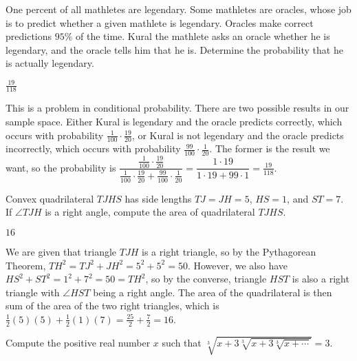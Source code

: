 \documentclass[11pt]{article}
\begin{document}
\begin{problem}%
One percent of all mathletes are legendary. Some mathletes are oracles, whose job is to predict
whether a given mathlete is legendary. Oracles make correct predictions $95\%$ of the time.
Kural the mathlete asks an oracle whether he is legendary, and the oracle tells him that he is.
Determine the probability that he is actually legendary.
\end{problem}

\begin{answer}
$\boxed{\frac{19}{118}}$
\end{answer}

\begin{solution}
This is a problem in conditional probability. There are two possible results in our sample space.
Either Kural is legendary and the oracle predicts correctly, which occurs with probability
$\frac{1}{100} \cdot \frac{19}{20}$, or Kural is not legendary and the oracle predicts incorrectly, 
which occurs with probability $\frac{99}{100} \cdot \frac{1}{20}$. The former is the result we
want, so the probability is $\dfrac{\frac{1}{100} \cdot \frac{19}{20}}{\frac{1}{100} \cdot \frac{19}{20} + \frac{99}{100} \cdot \frac{1}{20}}
= \dfrac{1 \cdot 19}{1 \cdot 19 + 99 \cdot 1} = \boxed{\frac{19}{118}}$.
\end{solution}


\begin{problem}%
Convex quadrilateral $TJHS$ has side lengths $TJ = JH = 5$, $HS = 1$, and $ST = 7$. If $\angle TJH$ is a right
angle, compute the area of quadrilateral $TJHS$.
\end{problem}

\begin{answer}
$\boxed{16}$
\end{answer}

\begin{solution}
We are given that triangle $TJH$ is a right triangle, so by the Pythagorean Theorem, 
$TH^2 = TJ^2 + JH^2 = 5^2 + 5^2 = 50$. However, we also have $HS^2 + ST^2 = 1^2 + 7^2 = 50 = TH^2$, 
so by the converse, triangle $HST$ is also a right triangle with $\angle HST$ being a right angle. 
The area of the quadrilateral is then sum of the area of the two right triangles, 
which is $\frac{1}{2}(5)(5) + \frac{1}{2}(1)(7) = \frac{25}{2} + \frac{7}{2} = \boxed{16}$.
\end{solution}


\begin{problem}%
Compute the positive real number $x$ such that $\sqrt[3]{x + 3\sqrt[3]{x + 3\sqrt[3]{x + \cdots}}} = 3$.
\end{problem}
\end{document}
